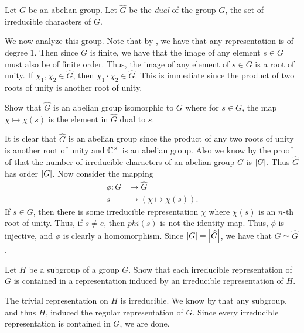\documentclass[letterpaper, 11pt, oneside]{book}
\begin{document}
\begin{defn}
  Let $G$ be an abelian group.
  Let $\widehat{G}$ be the \emph{dual} of the group $G$, the set of irreducible characters of $G$.

  We now analyze this group.
  Note that by , we have that any representation is of degree $1$.
  Then since $G$ is finite, we have that the image of any element $s \in G$ must also be of finite order.
  Thus, the image of any element of $s \in G$ is a root of unity.
  If $\chi_{1}, \chi_{2} \in \widehat{G}$, then $\chi_{1} \cdot \chi_{2} \in \widehat{G}$.
  This is immediate since the product of two roots of unity is another root of unity.
\end{defn}

\begin{exercise}
  Show that $\widehat{G}$ is an abelian group isomorphic to $G$ where for $s \in G$, the map $\chi \mapsto \chi(s)$ is the element in $\widehat{G}$ dual to $s$.
\end{exercise}
\begin{pf}
  It is clear that $\widehat{G}$ is an abelian group since the product of any two roots of unity is another root of unity and $\mathbb{C}^{\times}$ is an abelian group.
  Also we know by the proof of  that the number of irreducible characters of an abelian group $G$ is $\abs{G}$.
  Thus $\widehat{G}$ has order $\abs{G}$.
  Now consider the mapping
  \begin{align*}
    \phi\colon G &\to \widehat{G} \\
               s &\mapsto (\chi \mapsto \chi(s)).
  \end{align*}
  If $s \in G$, then there is some irreducible representation $\chi$ where $\chi(s)$ is an $n$-th root of unity.
  Thus, if $s \neq e$, then $phi(s)$ is not the identity map.
  Thus, $\phi$ is injective, and $\phi$ is clearly a homomorphism.
  Since $\abs{G} = \abs{\widehat{G}}$, we have that $G \simeq \widehat{G}$.
\end{pf}

\begin{exercise}\label{er:serre_3_4}
  Let $H$ be a subgroup of a group $G$.
  Show that each irreducible representation of $G$ is contained in a representation induced by an irreducible representation of $H$.
\end{exercise}
\begin{pf}
  The trivial representation on $H$ is irreducible.
  We know by  that any subgroup, and thus $H$, induced the regular representation of $G$.
  Since every irreducible representation is contained in $G$, we are done.
\end{pf}
\end{document}
